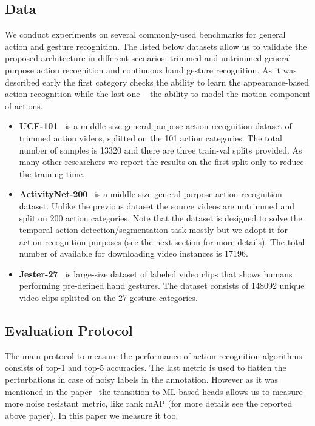 \documentclass[twoside, twocolumn]{article}
\begin{document}
\subsection{Data}

\lettrine[nindent=0em,lines=3]{W}{}e conduct experiments on several commonly-used benchmarks for general action and
gesture recognition. The listed below datasets allow us to validate the proposed architecture in different scenarios:
trimmed and untrimmed general purpose action recognition and continuous hand gesture recognition. As it was described
early the first category checks the ability to learn the appearance-based action recognition while the last one -- the
ability to model the motion component of actions.

\begin{itemize}
\item \textbf{UCF-101}~\cite{UCF101} is a middle-size general-purpose action recognition dataset of trimmed action
videos, splitted on the 101 action categories. The total number of samples is 13320 and there are three train-val splits
provided. As many other researchers we report the results on the first split only to reduce the training time.
\item \textbf{ActivityNet-200}~\cite{ActivityNet} is a middle-size general-purpose action recognition dataset. Unlike
the previous dataset the source videos are untrimmed and split on 200 action categories. Note that the dataset is
designed to solve the temporal action detection/segmentation task mostly but we adopt it for action recognition purposes 
(see the next section for more details). The total number of available for downloading video instances is 17196.
\item \textbf{Jester-27}~\cite{Jester} is large-size dataset of labeled video clips that shows humans performing
pre-defined hand gestures. The dataset consists of 148092 unique video clips splitted on the 27 gesture categories.
\end{itemize}

\subsection{Evaluation Protocol}

\lettrine[nindent=0em,lines=3]{T}{}he main protocol to measure the performance of action recognition algorithms consists
of top-1 and top-5 accuracies. The last metric is used to flatten the perturbations in case of noisy labels in the
annotation. However as it was mentioned in the paper~\cite{ASLNet} the transition to ML-based heads allows us to measure
more noise resistant metric, like rank mAP (for more details see the reported above paper). In this paper we measure it
too.
\end{document}
